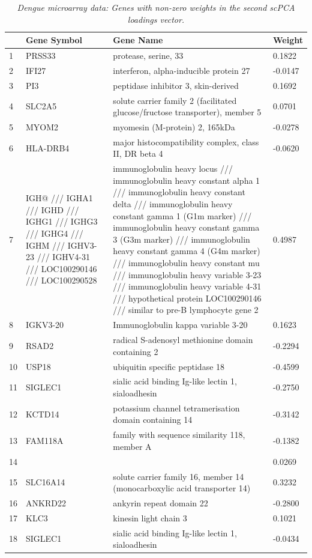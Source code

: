 \documentclass{article}
\begin{document}
\begin{longtable}{| l | p{4cm} | p{8cm} | l |}
  \caption{{\em Dengue microarray data: Genes with non-zero weights in the second scPCA loadings vector.}}  \label{tab:dengue_2} \\
  \hline
 & Gene Symbol & Gene Name & Weight \\ 
  \hline
  \endhead
  1 & PRSS33 & protease, serine, 33 & 0.1822 \\ 
  2 & IFI27 & interferon, alpha-inducible protein 27 & -0.0147 \\ 
  3 & PI3 & peptidase inhibitor 3, skin-derived & 0.1692 \\ 
  4 & SLC2A5 & solute carrier family 2 (facilitated glucose/fructose transporter), member 5 & 0.0701 \\ 
  5 & MYOM2 & myomesin (M-protein) 2, 165kDa & -0.0278 \\ 
  6 & HLA-DRB4 & major histocompatibility complex, class II, DR beta 4 & -0.0620 \\ 
  7 & IGH@ /// IGHA1 /// IGHD /// IGHG1 /// IGHG3 /// IGHG4 /// IGHM /// IGHV3-23 /// IGHV4-31 /// LOC100290146 /// LOC100290528 & immunoglobulin heavy locus /// immunoglobulin heavy constant alpha 1 /// immunoglobulin heavy constant delta /// immunoglobulin heavy constant gamma 1 (G1m marker) /// immunoglobulin heavy constant gamma 3 (G3m marker) /// immunoglobulin heavy constant gamma 4 (G4m marker) /// immunoglobulin heavy constant mu /// immunoglobulin heavy variable 3-23 /// immunoglobulin heavy variable 4-31 /// hypothetical protein LOC100290146 /// similar to pre-B lymphocyte gene 2 & 0.4987 \\ 
  8 & IGKV3-20 & Immunoglobulin kappa variable 3-20 & 0.1623 \\ 
  9 & RSAD2 & radical S-adenosyl methionine domain containing 2 & -0.2294 \\ 
  10 & USP18 & ubiquitin specific peptidase 18 & -0.4599 \\ 
  11 & SIGLEC1 & sialic acid binding Ig-like lectin 1, sialoadhesin & -0.2750 \\ 
  12 & KCTD14 & potassium channel tetramerisation domain containing 14 & -0.3142 \\ 
  13 & FAM118A & family with sequence similarity 118, member A & -0.1382 \\ 
  14 &  &  & 0.0269 \\ 
  15 & SLC16A14 & solute carrier family 16, member 14 (monocarboxylic acid transporter 14) & 0.3232 \\ 
  16 & ANKRD22 & ankyrin repeat domain 22 & -0.2800 \\ 
  17 & KLC3 & kinesin light chain 3 & 0.1021 \\ 
  18 & SIGLEC1 & sialic acid binding Ig-like lectin 1, sialoadhesin & -0.0434 \\ 
   \hline
\end{longtable}
\end{document}
